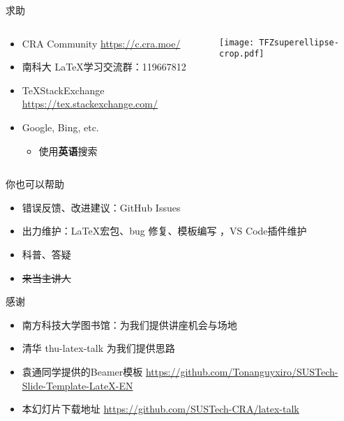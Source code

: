 \begin{frame}{求助}
  \begin{columns}[c]
    \begin{column}{.45\textwidth}
      \begin{itemize}
        \item CRA Community \url{https://c.cra.moe/}
        \item 南科大 \LaTeX 学习交流群：119667812
        \item \TeX StackExchange \url{https://tex.stackexchange.com/}
        \item Google, Bing, etc.
          \begin{itemize}
            \item 使用\textbf{英语}搜索
          \end{itemize}
      \end{itemize}
    \end{column}
    \begin{column}{.45\textwidth}
      \texttt{[image: TFZsuperellipse-crop.pdf]}
    \end{column}
  \end{columns}
\end{frame}

\begin{frame}{你也可以帮助}
  \begin{itemize}
    \item 错误反馈、改进建议：GitHub Issues 
    \item 出力维护：\LaTeX 宏包、bug 修复、模板编写 ，VS Code插件维护 
    \item 科普、答疑
    \item \sout{来当主讲人}
  \end{itemize}
\end{frame}

\begin{frame}{感谢}
  \begin{itemize}
    \item 南方科技大学图书馆：为我们提供讲座机会与场地
    \item 清华 thu-latex-talk  为我们提供思路
    \item 袁通同学提供的Beamer模板 \url{https://github.com/Tonanguyxiro/SUSTech-Slide-Template-LateX-EN}
    \item 本幻灯片下载地址 \url{https://github.com/SUSTech-CRA/latex-talk}
  \end{itemize}
\end{frame}

